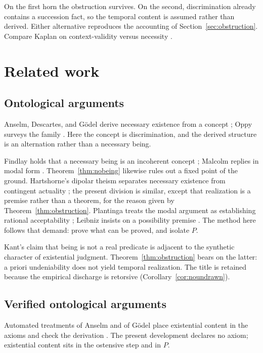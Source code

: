 \documentclass[11pt]{article}
\begin{document}
On the first horn the obstruction survives. On the second, discrimination already contains a succession fact, so the temporal content is assumed rather than derived. Either alternative reproduces the accounting of Section~\ref{sec:obstruction}. Compare Kaplan on context-validity versus necessity \cite{kaplan1989}.

\section{Related work}
\label{sec:related}

\subsection{Ontological arguments}
Anselm, Descartes, and Gödel derive necessary existence from a concept \cite{anselm,descartes,godel1995}; Oppy surveys the family \cite{oppy1995,oppy2018}. Here the concept is discrimination, and the derived structure is an alternation rather than a necessary being.

Findlay holds that a necessary being is an incoherent concept \cite{findlay1948}; Malcolm replies in modal form \cite{malcolm1960}. Theorem~\ref{thm:nobeing} likewise rules out a fixed point of the ground. Hartshorne's dipolar theism separates necessary existence from contingent actuality \cite{hartshorne1962}; the present division is similar, except that realization is a premise rather than a theorem, for the reason given by Theorem~\ref{thm:obstruction}. Plantinga treats the modal argument as establishing rational acceptability \cite{plantinga1974}; Leibniz insists on a possibility premise \cite{leibniz1714}. The method here follows that demand: prove what can be proved, and isolate $P$.

Kant's claim that being is not a real predicate \cite{kant1781} is adjacent to the synthetic character of existential judgment. Theorem~\ref{thm:obstruction} bears on the latter: a priori undeniability does not yield temporal realization. The title is retained because the empirical discharge is retorsive (Corollary~\ref{cor:noundrawn}).

\subsection{Verified ontological arguments}
Automated treatments of Anselm and of Gödel place existential content in the axioms and check the derivation \cite{oppenheimerzalta2011,benzmuller2014,sobel1987,benzmuller2016,anderson1990}. The present development declares no axiom; existential content sits in the ostensive step and in $P$.
\end{document}
